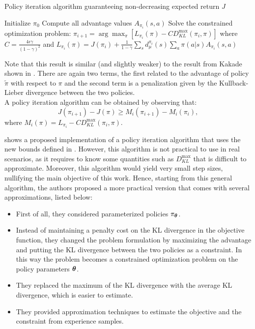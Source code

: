 \begin{algorithm}[!t]
\caption[PI algorithm guaranteeing non-decreasing expected return $J$.]{Policy iteration algorithm guaranteeing non-decreasing expected return $J$}
\label{alg:trpo-iteration}
\begin{algorithmic}
\State Initialize $\pi_0$
\State Compute all advantage values $A_{\pi_i}(s,a)$
\State Solve the constrained optimization problem:
\State $\pi_{i+1} = \arg\max_\pi \left[ L_{\pi_i}(\pi)-CD_{KL}^{\max}(\pi_i, \pi) \right]$
\State \qquad where $C = \frac{4\epsilon\gamma}{(1-\gamma)^2}$
\State \qquad and $L_{\pi_i}(\pi)=J(\pi_i) + \frac{1}{1-\gamma}\sum_s d_\mu^{\pi_i}(s)\sum_a\pi(a|s)A_{\pi_i}(s,a)$
\EndFor
\end{algorithmic}
\end{algorithm}

Note that this result is similar (and slightly weaker) to the result from Kakade shown in . There are again two terms, the first related to the advantage of policy $\tilde{\pi}$ with respect to $\pi$ and the second term is a penalization given by the Kullback-Lieber divergence between the two policies.\\
A policy iteration algorithm can be obtained by observing that:
\[
J(\pi_{i+1}) - J(\pi) \geq M_i(\pi_{i+1}) - M_i(\pi_i),
\]
where $M_i(\pi) = L_{\pi_i} - CD_{KL}^{\max}(\pi_i, \pi)$.

 shows a proposed implementation of a policy iteration algorithm that uses the new bounds defined in . However, this algorithm is not practical to use in real scenarios, as it requires to know some quantities such as $D_{KL}^{\max}$ that is difficult to approximate. Moreover, this algorithm would yield very small step sizes, nullifying the main objective of this work. Hence, starting from this general algorithm, the authors proposed a more practical version that comes with several approximations, listed below:
\begin{itemize}
\item First of all, they considered parameterized policies $\pi_{{\boldsymbol{\theta}}}$.
\item Instead of maintaining a penalty cost on the KL divergence in the objective function, they changed the problem formulation by maximizing the advantage and putting the KL divergence between the two policies as a constraint. In this way the problem becomes a constrained optimization problem on the policy parameters ${\boldsymbol{\theta}}$.
\item They replaced the maximum of the KL divergence with the average KL divergence, which is easier to estimate.
\item They provided approximation techniques to estimate the objective and the constraint from experience samples.
\end{itemize}

